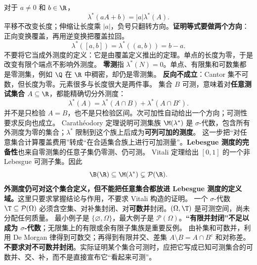 对于 $a\ne0$ 和 $b\in\R$，
\[
\lambda^*(aA+b)=|a|\lambda^*(A).
\]
平移不改变长度；伸缩让长度乘 $|a|$，负号只翻转方向。\textbf{证明等式要做两个方向}：正向变换覆盖，再用逆变换把覆盖拉回。
\[
\lambda^*([a,b])=\lambda^*((a,b))=b-a.
\]
不要将它当成外测度的定义：它是由覆盖定义推出的定理。单点的长度为零，于是改变有限个端点不影响外测度。
\textbf{零测}指 $\lambda^*(N)=0$。单点、有限集和可数集都是零测集，例如 $\Q$ 在 $\R$ 中稠密，却仍是零测集。
\textbf{反向不成立}：Cantor 集不可数，但长度为零。元素很多与长度很大是两件事。
集合 $B$ 可测，意味着对\textbf{任意测试集合} $A\subseteq\R$，都能精确切分外测度：
\[
\lambda^*(A)=\lambda^*(A\cap B)+\lambda^*(A\cap B^c).
\]
并不是只检验 $A=B$，也不是只检验区间。次可加性自动给出一个方向；可测性要求反向也成立。
Carathéodory 定理说明可测集族 $\M(\lambda^*)$ 是 $\sigma$-代数，包含所有外测度为零的集合；$\lambda^*$ 限制到这个族上后成为\textbf{可列可加的测度}。
这一步把“对任意集合计算覆盖费用”转成“在合适集合族上进行可加测量”。\textbf{Lebesgue 测度的完备性}也来自零测集的任意子集仍零测、仍可测。
Vitali 定理给出 $[0,1]$ 的一个非 Lebesgue 可测子集。因此
\[
\B(\R)\subseteq\M(\lambda^*)\subsetneq\mathcal P(\R).
\]
\textbf{外测度仍可对这个集合定义，但不能把任意集合都放进 Lebesgue 测度的定义域。}这里只要求掌握结论与作用，不要求 Vitali 构造的证明。
一个 $\sigma$-代数 $\T\subseteq\mathcal P(\Omega)$ 必须含空集、对补集封闭、对\textbf{可数并}封闭。$(\Omega,\T)$ 是可测空间，尚未分配任何质量。
最小例子是 $\{\varnothing,\Omega\}$，最大例子是 $\mathcal P(\Omega)$。\textbf{“有限并封闭”不足以成为 $\sigma$-代数}；无限集上的有限或余有限子集族是重要反例。
由补集和可数并，利用 De Morgan 律得到可数交；再得到有限并交、差集 $A\setminus B=A\cap B^c$ 和对称差。
\textbf{不要求对不可数并封闭}。实际证明某个集合可测时，应把它写成已知可测集合的可数并、交、补，而不是直接宣布它“看起来可测”。
